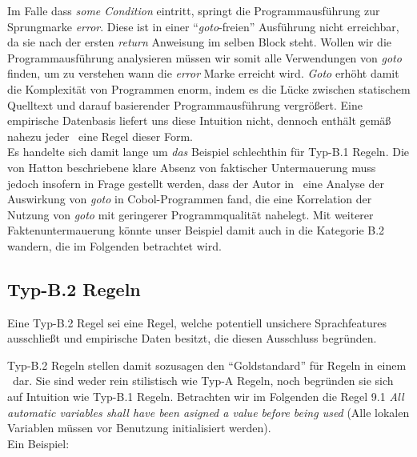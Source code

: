 \documentclass[a4paper,UKenglish,cleveref, autoref]{templates/lipics-v2019}
\begin{document}
    \noindent
    \begin{minipage}{\linewidth}
        \begin{example}
            
        \end{example}
    \end{minipage}

    Im Falle dass \textit{some Condition} eintritt, springt die Programmausführung zur Sprungmarke \textit{error}.
    Diese ist in einer \enquote{\textit{goto}-freien} Ausführung nicht erreichbar, da sie nach der ersten \textit{return}
    Anweisung im selben Block steht.
    Wollen wir die Programmausführung analysieren müssen wir somit alle Verwendungen von \textit{goto} finden,
    um zu verstehen wann die \textit{error} Marke erreicht wird.
    \textit{Goto} erhöht damit die Komplexität von Programmen enorm, indem es die Lücke zwischen statischem
    Quelltext und darauf basierender Programmausführung vergrößert.\cite{goto-harmful}
    Eine empirische Datenbasis liefert uns diese Intuition nicht, dennoch enthält gemäß~\cite{hatton2004safer}
    nahezu jeder \sqs\ eine Regel dieser Form.\\
    Es handelte sich damit lange um \textit{das} Beispiel schlechthin für Typ-B.1 Regeln.
    Die von Hatton beschriebene klare Absenz von faktischer Untermauerung muss jedoch insofern in Frage gestellt werden,
    dass der Autor in~\cite{goto-study} eine Analyse der Auswirkung von \textit{goto} in Cobol-Programmen fand, die eine
    Korrelation der Nutzung von \textit{goto} mit geringerer Programmqualität nahelegt.
    Mit weiterer Faktenuntermauerung könnte unser Beispiel damit auch in die Kategorie B.2 wandern, die im Folgenden
    betrachtet wird.

    \subsection{Typ-B.2 Regeln}
    \label{subsec:typ-b-2-regeln}
    \begin{definition}
        Eine Typ-B.2 Regel sei eine Regel, welche potentiell unsichere Sprachfeatures ausschließt und empirische
        Daten besitzt, die diesen Ausschluss begründen.
    \end{definition}

    Typ-B.2 Regeln stellen damit sozusagen den \enquote{Goldstandard} für Regeln in einem \sqs\ dar.
    Sie sind weder rein stilistisch wie Typ-A Regeln, noch begründen sie sich auf Intuition wie Typ-B.1 Regeln.
    Betrachten wir im Folgenden die Regel 9.1 \textit{All automatic variables shall have been asigned a value before being used}
    (Alle lokalen Variablen müssen vor Benutzung initialisiert werden).\\
    Ein Beispiel:
\end{document}
